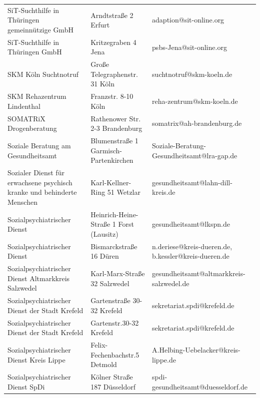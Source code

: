 {\begin{xltabular}{\textwidth} {
 >{\raggedright\arraybackslash}p{5cm}
 >{\raggedright\arraybackslash}X
 >{\raggedright\arraybackslash}p{5cm} }
SiT-Suchthilfe in Thüringen gemeinnützige GmbH & Arndtstraße 2 Erfurt & adaption@sit-online.org \\
SiT-Suchthilfe in Thüringen GmbH & Kritzegraben 4 Jena & psbs-Jena@sit-online.org \\
SKM Köln Suchtnotruf & Große Telegraphenstr. 31 Köln & suchtnotruf@skm-koeln.de \\
SKM Rehazentrum Lindenthal & Franzstr. 8-10 Köln & reha-zentrum@skm-koeln.de \\
SOMATRiX Drogenberatung & Rathenower Str. 2-3 Brandenburg & somatrix@ah-brandenburg.de \\
Soziale Beratung am Gesundheitsamt & Blumenstraße 1 Garmisch-Partenkirchen & Soziale-Beratung-Gesundheitsamt@lra-gap.de \\
Sozialer Dienst für erwachsene psychisch kranke und behinderte Menschen & Karl-Kellner-Ring 51 Wetzlar & gesundheitsamt@lahn-dill-kreis.de \\
Sozialpsychiatrischer Dienst & Heinrich-Heine-Straße 1 Forst (Lausitz) & gesundheitsamt@lkspn.de \\
Sozialpsychiatrischer Dienst & Bismarckstraße 16 Düren & n.deriese@kreis-dueren.de, b.kessler@kreis-dueren.de \\
Sozialpsychiatrischer Dienst Altmarkkreis Salzwedel & Karl-Marx-Straße 32 Salzwedel & gesundheitsamt@altmarkkreis-salzwedel.de \\
Sozialpsychiatrischer Dienst der Stadt Krefeld & Gartenstraße 30-32 Krefeld & sekretariat.spdi@krefeld.de \\
Sozialpsychiatrischer Dienst der Stadt Krefeld & Gartenstr.30-32 Krefeld & sekretariat.spdi@krefeld.de \\
Sozialpsychiatrischer Dienst Kreis Lippe & Felix-Fechenbachstr.5 Detmold & A.Helbing-Uebelacker@kreis-lippe.de \\
Sozialpsychiatrischer Dienst SpDi & Kölner Straße 187 Düsseldorf & spdi-gesundheitsamt@duesseldorf.de \\

\end{xltabular}}
